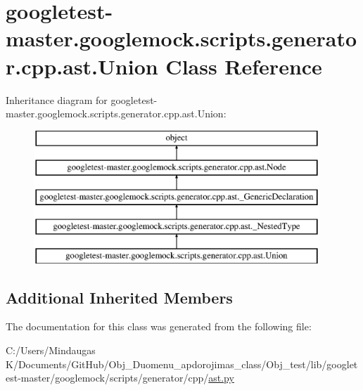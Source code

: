 \hypertarget{classgoogletest-master_1_1googlemock_1_1scripts_1_1generator_1_1cpp_1_1ast_1_1_union}{}\section{googletest-\/master.googlemock.\+scripts.\+generator.\+cpp.\+ast.\+Union Class Reference}
\label{classgoogletest-master_1_1googlemock_1_1scripts_1_1generator_1_1cpp_1_1ast_1_1_union}
Inheritance diagram for googletest-\/master.googlemock.\+scripts.\+generator.\+cpp.\+ast.\+Union\+:\begin{figure}[H]
\begin{center}
\leavevmode
\includegraphics[height=5.000000cm]{da/d94/classgoogletest-master_1_1googlemock_1_1scripts_1_1generator_1_1cpp_1_1ast_1_1_union}
\end{center}
\end{figure}
\subsection*{Additional Inherited Members}


The documentation for this class was generated from the following file\+:\begin{DoxyCompactItemize}
\item 
C\+:/\+Users/\+Mindaugas K/\+Documents/\+Git\+Hub/\+Obj\+\_\+\+Duomenu\+\_\+apdorojimas\+\_\+class/\+Obj\+\_\+test/lib/googletest-\/master/googlemock/scripts/generator/cpp/\mbox{\hyperlink{_obj__test_2lib_2googletest-master_2googlemock_2scripts_2generator_2cpp_2ast_8py}{ast.\+py}}\end{DoxyCompactItemize}

